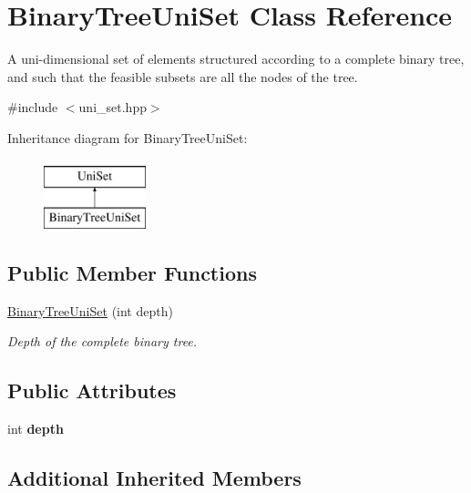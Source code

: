 \hypertarget{classBinaryTreeUniSet}{\section{Binary\-Tree\-Uni\-Set Class Reference}
\label{classBinaryTreeUniSet}
}


A uni-\/dimensional set of elements structured according to a complete binary tree, and such that the feasible subsets are all the nodes of the tree.  




{\ttfamily \#include $<$uni\-\_\-set.\-hpp$>$}

Inheritance diagram for Binary\-Tree\-Uni\-Set\-:\begin{figure}[H]
\begin{center}
\leavevmode
\includegraphics[height=2.000000cm]{classBinaryTreeUniSet}
\end{center}
\end{figure}
\subsection*{Public Member Functions}
\begin{DoxyCompactItemize}
\item 
\hyperlink{classBinaryTreeUniSet_a021574966253c10e6ce2a841c7769bcf}{Binary\-Tree\-Uni\-Set} (int depth)
\begin{DoxyCompactList}\small\item\em Depth of the complete binary tree. \end{DoxyCompactList}\end{DoxyCompactItemize}
\subsection*{Public Attributes}
\begin{DoxyCompactItemize}
\item 
\hypertarget{classBinaryTreeUniSet_a24adf00d08f78573c3857a754461ce18}{int {\bfseries depth}}\label{classBinaryTreeUniSet_a24adf00d08f78573c3857a754461ce18}

\end{DoxyCompactItemize}
\subsection*{Additional Inherited Members}



